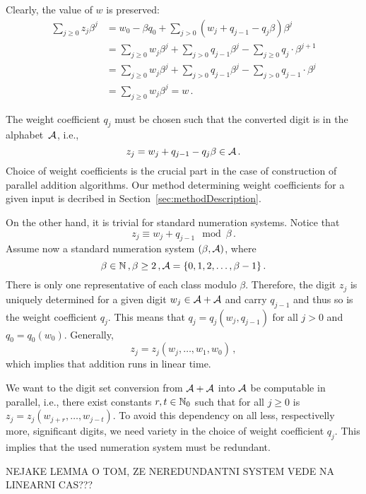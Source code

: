      Clearly, the value of $w$ is preserved:
\begin{align*}
    \sum_{j\geq 0} z_j \beta^j &=w_0 - \beta q_0 + \sum_{j> 0} (w_j + q_{j-1} - q_j \beta) \beta^j \\
    &=\sum_{j\geq 0} w_j \beta^j + \sum_{j>0} q_{j-1} \beta^j - \sum_{j\geq 0} q_j \cdot \beta^{j+1} \\
    &=\sum_{j\geq 0} w_j \beta^j + \sum_{j>0} q_{j-1} \beta^j - \sum_{j> 0} q_{j-1} \cdot \beta^j \\
    &=\sum_{j\geq 0} w_j \beta^j = w\,.
\end{align*}

     The weight coefficient $q_j$ must be chosen such that the converted digit is in the alphabet~$\mathcal{A}$, i.e., 
    \begin{equation}
    \label{eq:conversionFormula}
        z_j=w_j + q_{j-1} - q_j \beta \in \mathcal{A}\,.
    \end{equation}
    Choice of weight coefficients is the crucial part in the case of construction of parallel addition algorithms. Our method determining weight coefficients for a given input is decribed in Section~\ref{sec:methodDescription}.
    
     On the other hand, it is trivial for standard numeration systems.  Notice that
    $$
        z_j \equiv w_j+q_{j-1} \mod \beta\,. 
    $$
  Assume now a standard numeration system $(\beta, \mathcal{A})$, where
  $$
    \beta \in \mathbb{N}\,,\beta  \geq 2\,, \mathcal{A} = \{0, 1, 2,\dots, \beta -1 \}\,.
  $$ 
  There is only one representative of each class modulo  $\beta$. Therefore, the digit $z_j$ is uniquely determined for a given digit $w_j \in \mathcal{A}+\mathcal{A}$ and carry $q_{j-1}$ and thus so is the weight coefficient $q_j$. This means that $q_j=q_j(w_j,q_{j-1})$ for all $j>0$ and  $q_0=q_0(w_0)$. Generally,
  $$
  z_j=z_j(w_j ,\dots , w_1, w_0)\,,
  $$
  which implies that addition runs in linear time.
  
  We want to the digit set conversion from $\mathcal{A}+\mathcal{A}$ into $\mathcal{A}$ be computable in parallel, i.e., there exist constants $r,t \in \mathbb{N}_0$ such that for all $j\geq 0$ is $z_j=z_j(w_{j+r},\dots,w_{j-t})$. To avoid this dependency on all less, respectivelly more, significant digits, we need variety in the choice of weight coefficient $q_j$. This implies that the used numeration system must be redundant.
  
  
  
  NEJAKE LEMMA O TOM, ZE NEREDUNDANTNI SYSTEM VEDE NA LINEARNI CAS???
  
  
  







